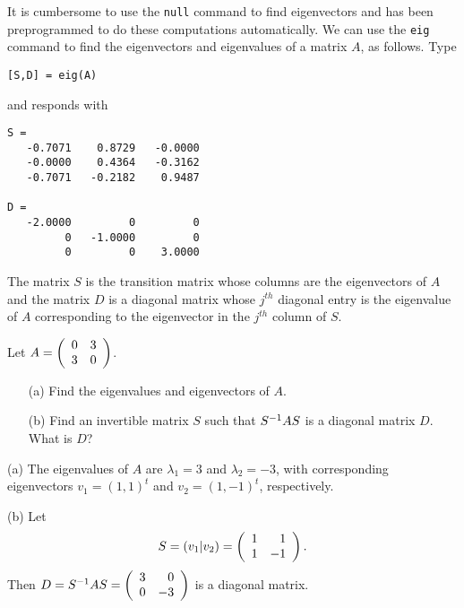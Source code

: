 \documentclass{ximera}
\begin{document}
It is cumbersome to use the 
{\tt null} command to find 
eigenvectors and \Matlab has been preprogrammed to do these
computations automatically.  We can use the {\tt eig} command 
to find the eigenvectors and eigenvalues of a matrix $A$, as 
follows.  Type
\begin{verbatim}
[S,D] = eig(A)
\end{verbatim}
and \Matlab responds with 
\begin{verbatim}
S =
   -0.7071    0.8729   -0.0000
   -0.0000    0.4364   -0.3162
   -0.7071   -0.2182    0.9487
 
D = 
   -2.0000         0         0
         0   -1.0000         0
         0         0    3.0000
\end{verbatim}
The matrix $S$ is the transition matrix 
whose columns are the 
eigenvectors of $A$ and the matrix $D$ is a diagonal matrix whose 
$j^{th}$ diagonal entry is the eigenvalue of $A$ corresponding to 
the eigenvector in the $j^{th}$ column of $S$.


\EXER

\TEXER

\begin{exercise} \label{c10.3.1}
Let $A=\left(\begin{array}{rr} 0 & 3\\ 3 &0\end{array}\right)$.  
\begin{itemize}
\item[(a)]  Find the eigenvalues and eigenvectors of $A$.
\item[(b)]  Find an invertible matrix $S$ such that $S^{-1} AS$ is a 
diagonal matrix $D$.  What is $D$?
\end{itemize}

\begin{solution}

(a) The eigenvalues of $A$ are $\lambda_1 = 3$ and $\lambda_2 = -3$,
with corresponding eigenvectors $v_1 = (1,1)^t$ and $v_2 = (1,-1)^t$,
respectively.

(b) Let
\[
S = (v_1|v_2) = \left(\begin{array}{rr} 1 & 1\\ 1 &-1\end{array}\right).
\]
Then $D = S^{-1}AS = \left(\begin{array}{rr} 3 & 0\\ 0 &-3\end{array}\right)$ is a diagonal matrix.

\end{solution}
\end{exercise}
\end{document}
